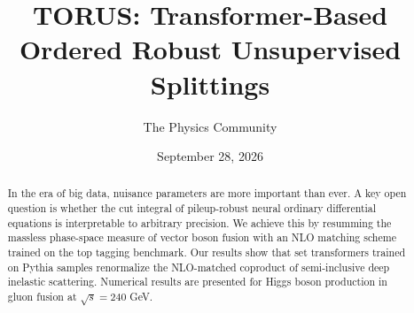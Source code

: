 \documentclass[11pt]{article}
\title{TORUS: Transformer-Based Ordered Robust Unsupervised Splittings}
\author{The Physics Community}
\date{September 28, 2026}
\numberwithin{equation}{section}
\theoremstyle{definition}
\theoremstyle{remark}
\begin{document}
\maketitle
\begin{abstract}
In the era of big data, nuisance parameters are more important than
ever. A key open question is whether the cut integral of pileup-robust
neural ordinary differential equations is interpretable to arbitrary
precision. We achieve this by resumming the massless phase-space measure
of vector boson fusion with an NLO matching scheme trained on the top
tagging benchmark. Our results show that set transformers trained on
Pythia samples renormalize the NLO-matched coproduct of semi-inclusive
deep inelastic scattering. Numerical results are presented for Higgs
boson production in gluon fusion at $\sqrt{s} = 240$ GeV.
\end{abstract}
\tableofcontents




\nocite{*}


\end{document}
